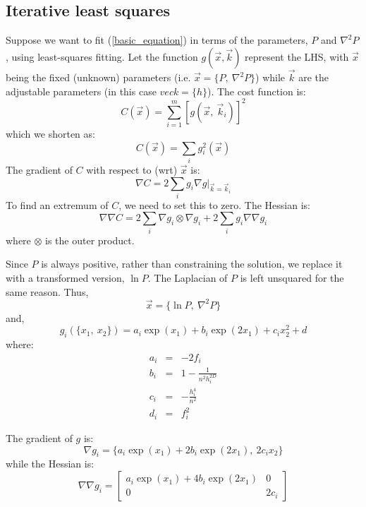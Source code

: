 \subsection{Iterative least squares}

Suppose we want to fit (\ref{basic_equation}) in terms of the parameters,
$P$ and $\nabla^2 P$, using least-squares fitting.
Let the function $g(\vec x, \vec k)$ represent the LHS, with
$\vec x$ being the fixed (unknown) parameters 
(i.e. $\vec x=\lbrace P, ~ \nabla^2 P \rbrace$)
while $\vec k$ are the adjustable parameters 
(in this case $vec k=\lbrace h \rbrace$).  
The cost function is:
\begin{equation}
C(\vec x) = \sum_{i=1}^m \left [g(\vec x, ~ \vec k_i)\right ]^2
\end{equation}
which we shorten as:
\begin{equation}
C(\vec x) = \sum_i g_i^2(\vec x)
\end{equation}
The gradient of $C$ with respect to (wrt) $\vec x$ is:
\begin{equation}
\nabla C = 2 \sum_i g_i \nabla g |_{\vec k=\vec k_i}
\end{equation}
To find an extremum of $C$, we need to set this to zero.
The Hessian is:
\begin{equation}
\nabla \nabla C = 2 \sum_i \nabla g_i \otimes \nabla g_i
		+2 \sum_i g_i \nabla \nabla g_i
\end{equation}
where $\otimes$ is the outer product.

Since $P$ is always positive, rather than constraining the solution, we 
replace it with a transformed version, $\ln P$.  The Laplacian of $P$ is
left unsquared for the same reason.  Thus,
\begin{equation}
\vec x= \lbrace \ln P, ~ \nabla^2 P \rbrace
\end{equation}
and,
\begin{equation}
g_i \left (\lbrace x_1, ~ x_2 \rbrace \right ) = a_i \exp(x_1) + b_i \exp(2 x_1) + c_i x_2^2 + d
\end{equation}
where:
\begin{eqnarray}
a_i & = & - 2 f_i \\
b_i & = & 1 - \frac{1}{n^2 h_i^{2 D}} \\
c_i & = & - \frac{h_i^4}{n^2} \\
d_i & = & f_i^2
\end{eqnarray}

The gradient of $g$ is:
\begin{equation}
\nabla g_i = \lbrace a_i \exp(x_1) + 2 b_i \exp(2 x_1), ~ 2 c_i x_2 \rbrace
\end{equation}
while the Hessian is:
\begin{equation}
\nabla \nabla g_i = 
\begin{bmatrix}
a_i \exp(x_1) + 4 b_i \exp(2 x_1) & 0 \\
0 & 2 c_i
\end{bmatrix}
\end{equation}

